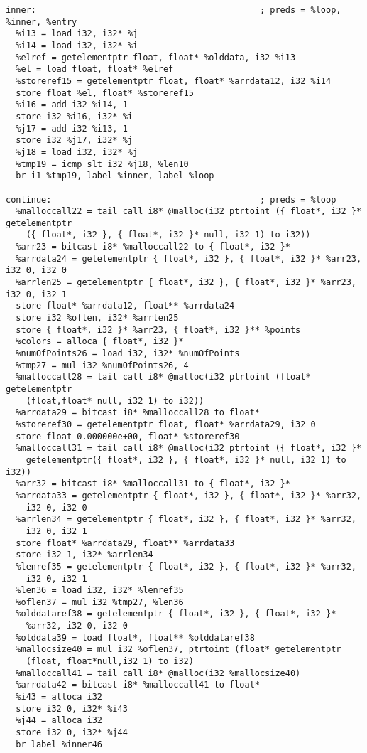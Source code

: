 \documentclass[main.tex]{subfiles}
\begin{document}
{\begin{lstlisting}
inner:                                            ; preds = %loop, %inner, %entry
  %i13 = load i32, i32* %j
  %i14 = load i32, i32* %i
  %elref = getelementptr float, float* %olddata, i32 %i13
  %el = load float, float* %elref
  %storeref15 = getelementptr float, float* %arrdata12, i32 %i14
  store float %el, float* %storeref15
  %i16 = add i32 %i14, 1
  store i32 %i16, i32* %i
  %j17 = add i32 %i13, 1
  store i32 %j17, i32* %j
  %j18 = load i32, i32* %j
  %tmp19 = icmp slt i32 %j18, %len10
  br i1 %tmp19, label %inner, label %loop

continue:                                         ; preds = %loop
  %malloccall22 = tail call i8* @malloc(i32 ptrtoint ({ float*, i32 }* getelementptr
    ({ float*, i32 }, { float*, i32 }* null, i32 1) to i32))
  %arr23 = bitcast i8* %malloccall22 to { float*, i32 }*
  %arrdata24 = getelementptr { float*, i32 }, { float*, i32 }* %arr23, i32 0, i32 0
  %arrlen25 = getelementptr { float*, i32 }, { float*, i32 }* %arr23, i32 0, i32 1
  store float* %arrdata12, float** %arrdata24
  store i32 %oflen, i32* %arrlen25
  store { float*, i32 }* %arr23, { float*, i32 }** %points
  %colors = alloca { float*, i32 }*
  %numOfPoints26 = load i32, i32* %numOfPoints
  %tmp27 = mul i32 %numOfPoints26, 4
  %malloccall28 = tail call i8* @malloc(i32 ptrtoint (float* getelementptr
    (float,float* null, i32 1) to i32))
  %arrdata29 = bitcast i8* %malloccall28 to float*
  %storeref30 = getelementptr float, float* %arrdata29, i32 0
  store float 0.000000e+00, float* %storeref30
  %malloccall31 = tail call i8* @malloc(i32 ptrtoint ({ float*, i32 }*
    getelementptr({ float*, i32 }, { float*, i32 }* null, i32 1) to i32))
  %arr32 = bitcast i8* %malloccall31 to { float*, i32 }*
  %arrdata33 = getelementptr { float*, i32 }, { float*, i32 }* %arr32,
    i32 0, i32 0
  %arrlen34 = getelementptr { float*, i32 }, { float*, i32 }* %arr32,
    i32 0, i32 1
  store float* %arrdata29, float** %arrdata33
  store i32 1, i32* %arrlen34
  %lenref35 = getelementptr { float*, i32 }, { float*, i32 }* %arr32,
    i32 0, i32 1
  %len36 = load i32, i32* %lenref35
  %oflen37 = mul i32 %tmp27, %len36
  %olddataref38 = getelementptr { float*, i32 }, { float*, i32 }* 
    %arr32, i32 0, i32 0
  %olddata39 = load float*, float** %olddataref38
  %mallocsize40 = mul i32 %oflen37, ptrtoint (float* getelementptr
    (float, float*null,i32 1) to i32)
  %malloccall41 = tail call i8* @malloc(i32 %mallocsize40)
  %arrdata42 = bitcast i8* %malloccall41 to float*
  %i43 = alloca i32
  store i32 0, i32* %i43
  %j44 = alloca i32
  store i32 0, i32* %j44
  br label %inner46


\end{lstlisting}}
\end{document}
